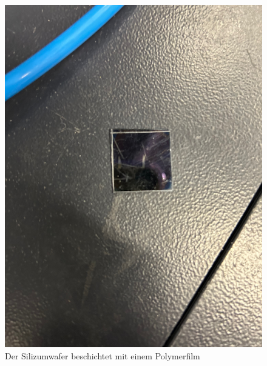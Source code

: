 \begin{figure}
    \includegraphics[width=\textwidth]{bilder/probe.jpeg}
    \caption{Der Silizumwafer beschichtet mit einem Polymerfilm}
    \label{fig:Abbildung 5}
\end{figure}


